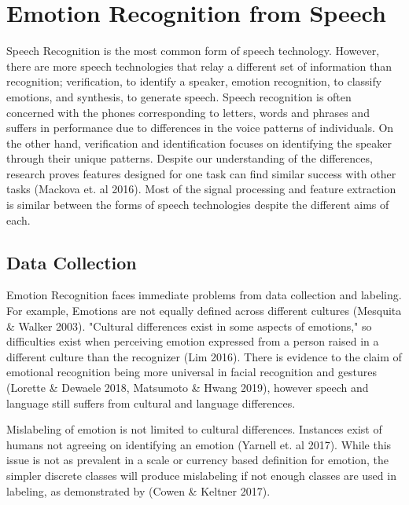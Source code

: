 \section{Emotion Recognition from Speech}
	Speech Recognition is the most common form of speech technology. However, there are more speech technologies that relay a different set of information than recognition; verification, to identify a speaker, emotion recognition, to classify emotions, and synthesis, to generate speech. Speech recognition is often concerned with the phones corresponding to letters, words and phrases and suffers in performance due to differences in the voice patterns of individuals. On the other hand, verification and identification focuses on identifying the speaker through their unique patterns. Despite our understanding of the differences, research proves features designed for one task can find similar success with other tasks (Mackova et. al 2016). Most of the signal processing and feature extraction is similar between the forms of speech technologies despite the different aims of each.
	
\subsection{Data Collection}
	Emotion Recognition faces immediate problems from data collection and labeling. For example, Emotions are not equally defined across different cultures (Mesquita \& Walker 2003). "Cultural differences exist in some aspects of emotions," so difficulties exist when perceiving emotion expressed from a person raised in a different culture than the recognizer (Lim 2016). There is evidence to the claim of emotional recognition being more universal in facial recognition and gestures (Lorette \& Dewaele 2018, Matsumoto \& Hwang 2019), however speech and language still suffers from cultural and language differences.
	
	Mislabeling of emotion is not limited to cultural differences. Instances exist of humans not agreeing on identifying an emotion (Yarnell et. al 2017). While this issue is not as prevalent in a scale or currency based definition for emotion, the simpler discrete classes will produce mislabeling if not enough classes are used in labeling, as demonstrated by (Cowen \& Keltner 2017).
	
